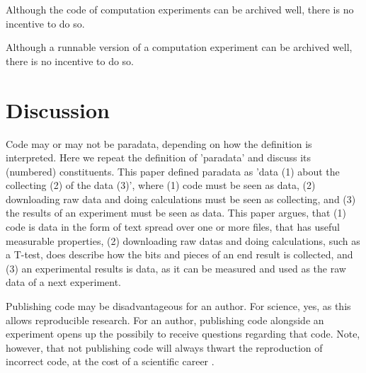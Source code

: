 Although the code of computation experiments can be archived well, 
there is no incentive to do so.

Although a runnable version of a computation experiment can be archived well, 
there is no incentive to do so.

\section{Discussion}


Code may or may not be paradata, depending on how the definition
is interpreted.
Here we repeat the definition of 'paradata' and discuss 
its (numbered) constituents.
This paper defined paradata as 'data (1) about the collecting (2) of the data (3)',
where (1) code must be seen as data, (2) downloading raw data
and doing calculations must be seen as collecting, and (3) the
results of an experiment must be seen as data.
This paper argues, that (1) code is data in the form of text spread
over one or more files, that has useful measurable properties, 
(2) downloading raw datas and doing calculations, such as a T-test,
does describe how the bits and pieces of an end result is collected,
and (3) an experimental results is data, as it can be measured and
used as the raw data of a next experiment.


Publishing code may be disadvantageous for an author.
For science, yes, as this allows reproducible research.
For an author, publishing code alongside an experiment opens up
the possibily to receive questions regarding that code.
Note, however, that not publishing code will always thwart
the reproduction of incorrect code, at the cost of a scientific
career \cite{baggerly2009deriving}.


